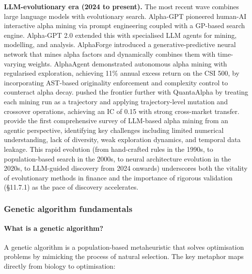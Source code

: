 \textbf{LLM-evolutionary era (2024 to present).} The most recent wave combines large language models with evolutionary search. Alpha-GPT \citep{wang2023alphagpt} pioneered human-AI interactive alpha mining via prompt engineering coupled with a GP-based search engine. Alpha-GPT 2.0 \citep{Yuan2024} extended this with specialised LLM agents for mining, modelling, and analysis. AlphaForge \citep{Shi2025} introduced a generative-predictive neural network that mines alpha factors and dynamically combines them with time-varying weights. AlphaAgent \citep{tang2025alphaagent} demonstrated autonomous alpha mining with regularised exploration, achieving 11\% annual excess return on the CSI 500, by incorporating AST-based originality enforcement and complexity control to counteract alpha decay. \cite{Han2026} pushed the frontier further with QuantaAlpha by treating each mining run as a trajectory and applying trajectory-level mutation and crossover operations, achieving an IC of 0.15 with strong cross-market transfer. \cite{ZhangJ2025} provide the first comprehensive survey of LLM-based alpha mining from an agentic perspective, identifying key challenges including limited numerical understanding, lack of diversity, weak exploration dynamics, and temporal data leakage. This rapid evolution (from hand-crafted rules in the 1990s, to population-based search in the 2000s, to neural architecture evolution in the 2020s, to LLM-guided discovery from 2024 onwards) underscores both the vitality of evolutionary methods in finance and the importance of rigorous validation (§11.7.1) as the pace of discovery accelerates.

\subsubsection{Genetic algorithm fundamentals}

\paragraph{What is a genetic algorithm?}

A genetic algorithm is a population-based metaheuristic that solves optimisation problems by mimicking the process of natural selection. The key metaphor maps directly from biology to optimisation:


